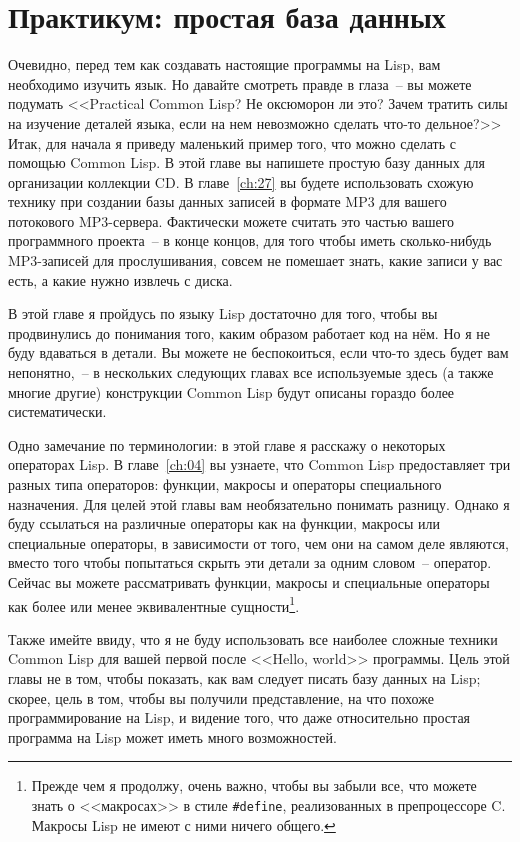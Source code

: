 \chapter{Практикум: простая база данных}
\label{ch:03}

Очевидно, перед тем как создавать настоящие программы на Lisp, вам необходимо изучить
язык. Но давайте смотреть правде в глаза~-- вы можете подумать <<Practical Common Lisp?
Не оксюморон ли это? Зачем тратить силы на изучение деталей языка, если на нем невозможно
сделать что-то дельное?>> Итак, для начала я приведу маленький пример того, что можно
сделать с помощью Common Lisp. В этой главе вы напишете простую базу данных для
организации коллекции CD. В главе~\ref{ch:27} вы будете использовать схожую технику при создании
базы данных записей в формате MP3 для вашего потокового MP3-сервера. Фактически можете
считать это частью вашего программного проекта~-- в конце концов, для того чтобы иметь
сколько-нибудь MP3-записей для прослушивания, совсем не помешает знать, какие записи у вас
есть, а какие нужно извлечь с диска.

В этой главе я пройдусь по языку Lisp достаточно для того, чтобы вы продвинулись до
понимания того, каким образом работает код на нём. Но я не буду вдаваться в детали. Вы
можете не беспокоиться, если что-то здесь будет вам непонятно,~-- в нескольких следующих
главах все используемые здесь (а также многие другие) конструкции Common Lisp будут
описаны гораздо более систематически.

Одно замечание по терминологии: в этой главе я расскажу о некоторых операторах Lisp. В
главе~\ref{ch:04} вы узнаете, что Common Lisp предоставляет три разных типа операторов: функции,
макросы и операторы специального назначения. Для целей этой главы вам необязательно
понимать разницу. Однако я буду ссылаться на различные операторы как на функции, макросы
или специальные операторы, в зависимости от того, чем они на самом деле являются, вместо
того чтобы попытаться скрыть эти детали за одним словом~-- оператор. Сейчас вы можете
рассматривать функции, макросы и специальные операторы как более или менее эквивалентные
сущности\footnote{Прежде чем я продолжу, очень важно, чтобы вы забыли все, что можете
  знать о <<макросах>> в стиле \lstinline!#define!, реализованных в препроцессоре C. Макросы
  Lisp не имеют с ними ничего общего.}.

Также имейте ввиду, что я не буду использовать все наиболее сложные техники Common Lisp
для вашей первой после <<Hello, world>> программы. Цель этой главы не в том, чтобы показать,
как вам следует писать базу данных на Lisp; скорее, цель в том, чтобы вы получили
представление, на что похоже программирование на Lisp, и видение того, что даже
относительно простая программа на Lisp может иметь много возможностей.

